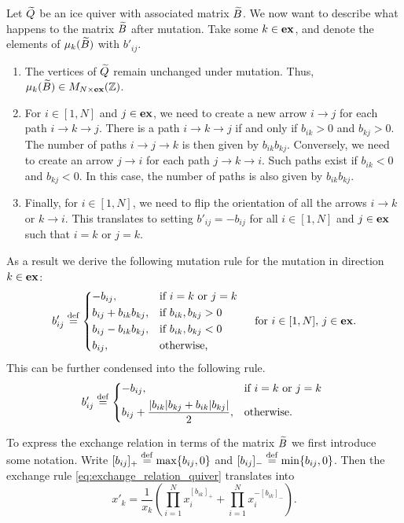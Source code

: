 Let $\widetilde{Q}$ be an ice quiver with associated matrix $\widetilde{B}$. We now want to describe what
happens to the matrix $\widetilde{B}$ after mutation. Take some $k \in \mathbf{ex}$, and denote the
elements of $\mu_k(\widetilde{B})$ with $b'_{ij}$.
\begin{enumerate}
	\item The vertices of $\widetilde{Q}$ remain unchanged under mutation. Thus, $\mu_k(\widetilde{B}) \in M_{N
				      \times \mathbf{ex}}(\mathbb{Z})$.
	\item For $i \in [1, N]$ and $j \in \mathbf{ex}$, we need to create a new arrow $i \to j$ for each
	      path $i \to k \to j$. There is a path $i \to k \to j$ if and only if $b_{ik} >0$ and
	      $b_{kj} > 0$. The number of paths $i\to j\to k$ is then given by $b_{ik}b_{kj}$.
	      Conversely, we need to create an arrow $j \to i$ for each path $j \to k \to i$. Such
	      paths exist if $b_{ik} <0$ and $b_{kj} < 0$. In this case, the number of paths is also
	      given by $b_{ik}b_{kj}$.
	\item Finally, for $i \in [1,N]$, we need to flip the orientation of all the arrows $i \to k$
	      or $k \to i$. This translates to setting $b'_{ij} = -b_{ij}$ for all $i \in [1, N]$ and
	      $j \in \mathbf{ex}$ such that $i = k$ or $j = k$.
\end{enumerate}
As a result we derive the following mutation rule for the mutation in direction $k\in \mathbf{ex}$:
\begin{equation}\label{eq:mutation_rule_matrix_expanded}
	b'_{ij} \defeq \begin{dcases*}
		-b_{ij},               & if $i = k$ or $j = k$  \\
		b_{ij} + b_{ik}b_{kj}, & if $b_{ik},b_{kj} > 0$ \\
		b_{ij} - b_{ik}b_{kj}, & if $b_{ik},b_{kj} < 0$ \\
		b_{ij},                & otherwise,
	\end{dcases*}
	\quad \text{for } i \in [1, N],\,j \in \ex.
\end{equation}
%
This can be further condensed into the following rule.
\begin{equation}\label{eq:mutation_rule_matrix_condensed}
	b'_{ij} \defeq \begin{dcases*}
		-b_{ij},                                            & if $i = k$ or $j = k$ \\
		b_{ij} + \frac{|b_{ik}|b_{kj} + b_{ik}|b_{kj}|}{2}, & otherwise.
	\end{dcases*}
\end{equation}

To express the exchange relation in terms of the matrix $\widetilde{B}$ we first introduce some
notation. Write $[b_{ij}]_{+} \overset{\mathrm{def}}{=} \max\{b_{ij}, 0\}$ and $[b_{ij}]_{-} \overset{\mathrm{def}}{=}
	\min\{b_{ij}, 0\}$. Then the exchange rule \cref{eq:exchange_relation_quiver}
translates into
\begin{equation}\label{eq:exchange_relation_matrix}
	x'_k = \frac{1}{x_k}\left(\prod_{i=1}^N x_i^{[b_{ik}]_{+}} + \prod_{i=1}^{N} x_i^{-[b_{ik}]_{-}}\right).
\end{equation}

